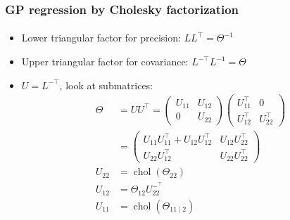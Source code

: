 \documentclass{beamer}                             %
\DeclareMathOperator{\chol}{chol}
\begin{document}
\begin{frame}
\frametitle{GP regression by Cholesky factorization}
\framesubtitle{}
\begin{itemize}
  \item<+-> Lower triangular factor for precision:
    \( L L^{\top} = \Theta^{-1} \)
  \item<+-> Upper triangular factor for covariance:
    \( L^{-\top} L^{-1} = \Theta \)
  \item<+-> \( U = L^{-\top} \), look at submatrices:
    \begin{align*}
      \Theta &= U U^{\top} =
      \begin{pmatrix}
        U_{11} & U_{12} \\
        0 & U_{22}
      \end{pmatrix}
      \begin{pmatrix}
        U_{11}^{\top} & 0 \\
        U_{12}^{\top} & U_{22}^{\top}
      \end{pmatrix} \\
      &=
      \begin{pmatrix}
        U_{11} U_{11}^{\top} + U_{12} U_{12}^{\top} & U_{12} U_{22}^{\top} \\
        U_{22} U_{12}^{\top} & U_{22} U_{22}^{\top}
      \end{pmatrix} \\
      U_{22} &= \chol(\Theta_{22}) \\
      U_{12} &= \Theta_{12} U_{22}^{-^{\top}} \\
      U_{11} &= \chol(\Theta_{11 \mid 2})
    \end{align*}
\end{itemize}
\end{frame}
\end{document}
